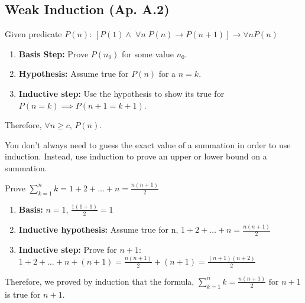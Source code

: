 \subsection{Weak Induction (Ap. A.2)}
    
    \begin{process}
        Given predicate $P(n)$: $[P(1) \land \; \forall n \; P(n) \rightarrow P(n+1)] \rightarrow \forall n P(n)$
        \begin{enumerate}
            \item \textbf{Basis Step:} Prove $P(n_0)$ for some value $n_0$. 
            \item \textbf{Hypothesis:} Assume true for $P(n)$ for a $n=k$.
            \item \textbf{Inductive step:} Use the hypothesis to show its true for $P(n=k) \implies P(n+1=k+1)$.
        \end{enumerate}
        Therefore, $\forall n \geq c \text{, } P(n)$.
    \end{process}

    \begin{intuition}
        You don't always need to guess the exact value of a summation in order to use induction. Instead, use induction to prove an upper or lower bound on a summation.
    \end{intuition}

    \begin{example}
        Prove $\sum_{k=1}^{n} k = 1 + 2 + \ldots + n = \frac{n(n+1)}{2}$
        \begin{enumerate}
            \item \textbf{Basis:} $n=1 \text{, } \frac{1(1+1)}{2} = 1$
            \item \textbf{Inductive hypothesis:} Assume true for n, $1 + 2 + \ldots + n = \frac{n(n+1)}{2}$
            \item \textbf{Inductive step:} Prove for $n+1$: $1 + 2 + \ldots + n + (n+1) = \frac{n(n+1)}{2} + (n+1) = \frac{(n+1)(n+2)}{2}$
        \end{enumerate}
        Therefore, we proved by induction that the formula, $\sum_{k=1}^{n} k = \frac{n(n+1)}{2} \text{ for } n+1$ is true for $n+1$.
    \end{example}

